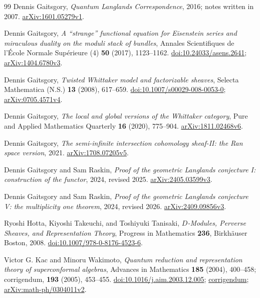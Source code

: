 \documentclass[11pt]{article}
\numberwithin{equation}{section}
\theoremstyle{definition}
\theoremstyle{remark}
\begin{document}
\begin{thebibliography}{99}
Dennis Gaitsgory,
\emph{Quantum Langlands Correspondence}, 2016; notes written in 2007.
\href{https://arxiv.org/abs/1601.05279v1}{arXiv:1601.05279v1}.

Dennis Gaitsgory,
\emph{A ``strange'' functional equation for Eisenstein series and miraculous
duality on the moduli stack of bundles},
Annales Scientifiques de l'\'Ecole Normale Sup\'erieure (4)
\textbf{50} (2017), 1123--1162.
\href{https://doi.org/10.24033/asens.2641}{doi:10.24033/asens.2641};
\href{https://arxiv.org/abs/1404.6780v3}{arXiv:1404.6780v3}.

Dennis Gaitsgory,
\emph{Twisted Whittaker model and factorizable sheaves},
Selecta Mathematica (N.S.) \textbf{13} (2008), 617--659.
\href{https://doi.org/10.1007/s00029-008-0053-0}{doi:10.1007/s00029-008-0053-0};
\href{https://arxiv.org/abs/0705.4571v4}{arXiv:0705.4571v4}.

Dennis Gaitsgory,
\emph{The local and global versions of the Whittaker category},
Pure and Applied Mathematics Quarterly \textbf{16} (2020), 775--904.
\href{https://arxiv.org/abs/1811.02468v6}{arXiv:1811.02468v6}.

Dennis Gaitsgory,
\emph{The semi-infinite intersection cohomology sheaf-II: the Ran space version},
2021.
\href{https://arxiv.org/abs/1708.07205v5}{arXiv:1708.07205v5}.

Dennis Gaitsgory and Sam Raskin,
\emph{Proof of the geometric Langlands conjecture I: construction of the functor},
2024, revised 2025.
\href{https://arxiv.org/abs/2405.03599v3}{arXiv:2405.03599v3}.

Dennis Gaitsgory and Sam Raskin,
\emph{Proof of the geometric Langlands conjecture V: the multiplicity one theorem},
2024, revised 2026.
\href{https://arxiv.org/abs/2409.09856v3}{arXiv:2409.09856v3}.

Ryoshi Hotta, Kiyoshi Takeuchi, and Toshiyuki Tanisaki,
\emph{$D$-Modules, Perverse Sheaves, and Representation Theory},
Progress in Mathematics \textbf{236}, Birkh\"auser Boston, 2008.
\href{https://doi.org/10.1007/978-0-8176-4523-6}{doi:10.1007/978-0-8176-4523-6}.

Victor G. Kac and Minoru Wakimoto,
\emph{Quantum reduction and representation theory of superconformal algebras},
Advances in Mathematics \textbf{185} (2004), 400--458;
corrigendum, \textbf{193} (2005), 453--455.
\href{https://doi.org/10.1016/j.aim.2003.12.005}{doi:10.1016/j.aim.2003.12.005};
\href{https://doi.org/10.1016/j.aim.2005.01.001}{corrigendum};
\href{https://arxiv.org/abs/math-ph/0304011v2}{arXiv:math-ph/0304011v2}.


\end{thebibliography}
\end{document}
